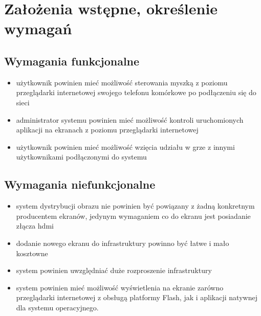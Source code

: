 \newpage
\section{Założenia wstępne, określenie wymagań}

\subsection{Wymagania funkcjonalne}

\begin{itemize}
	\item użytkownik powinien mieć możliwość sterowania myszką z poziomu przeglądarki internetowej swojego telefonu komórkowe po podłączeniu się do sieci
	\item administrator systemu powinien mieć możliwość kontroli uruchomionych aplikacji na ekranach z poziomu przeglądarki internetowej
	\item użytkownik powinien mieć możliwość wzięcia udziału w grze z innymi użytkownikami podłączonymi do systemu
\end{itemize}


\subsection{Wymagania niefunkcjonalne}
\begin{itemize}
	\item system dystrybucji obrazu nie powinien być powiązany z żadną konkretnym producentem ekranów, jedynym wymaganiem co do ekranu jest posiadanie złącza hdmi
	\item dodanie nowego ekranu do infrastruktury powinno być łatwe i mało kosztowne
	\item system powinien uwzględniać duże rozproszenie infrastruktury 
	\item system powinien mieć możliwość wyświetlenia na ekranie zarówno przeglądarki internetowej z obsługą platformy Flash, jak i aplikacji natywnej dla systemu operacyjnego.
\end{itemize}
